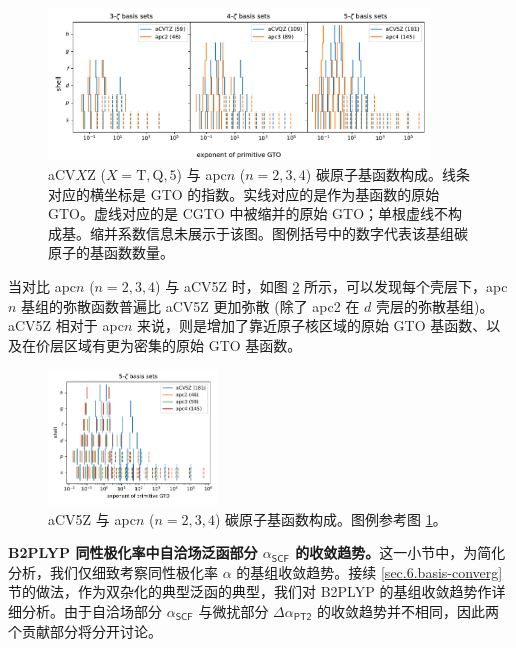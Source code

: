 \begin{figure}[ht]
    \centering
    \caption{aCV$X$Z ($X=\mathrm{T,Q,5}$) 与 apc$n$ ($n=2,3,4$) 碳原子基函数构成。线条对应的横坐标是 GTO 的指数。实线对应的是作为基函数的原始 GTO。虚线对应的是 CGTO 中被缩并的原始 GTO；单根虚线不构成基。缩并系数信息未展示于该图。图例括号中的数字代表该基组碳原子的基函数数量。}
    \label{fig.6.basis-exponent-plot}
    \includegraphics[width=0.9\textwidth]{assets/basis_exponent_plot.pdf}
\end{figure}

当对比 apc$n$ ($n=2,3,4$) 与 aCV5Z 时，如图 \ref{fig.6.basis-exponent-plot-compare} 所示，可以发现每个壳层下，apc$n$ 基组的弥散函数普遍比 aCV5Z 更加弥散 (除了 apc2 在 $d$ 壳层的弥散基组)。aCV5Z 相对于 apc$n$ 来说，则是增加了靠近原子核区域的原始 GTO 基函数、以及在价层区域有更为密集的原始 GTO 基函数。

\begin{figure}[ht]
    \centering
    \caption{aCV5Z 与 apc$n$ ($n=2,3,4$) 碳原子基函数构成。图例参考图 \ref{fig.6.basis-exponent-plot}。}
    \label{fig.6.basis-exponent-plot-compare}
    \includegraphics[width=0.4\textwidth]{assets/basis_exponent_plot_compare.pdf}
\end{figure}

\textbf{B2PLYP 同性极化率中自洽场泛函部分 $\alpha_\textsf{SCF}$ 的收敛趋势。}这一小节中，为简化分析，我们仅细致考察同性极化率 $\alpha$ 的基组收敛趋势。接续 \ref{sec.6.basis-converg} 节的做法，作为双杂化的典型泛函的典型，我们对 B2PLYP 的基组收敛趋势作详细分析。由于自洽场部分 $\alpha_\textsf{SCF}$ 与微扰部分 $\Delta \alpha_\textsf{PT2}$ 的收敛趋势并不相同，因此两个贡献部分将分开讨论。

